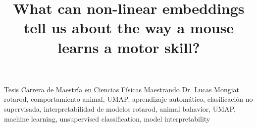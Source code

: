 \title{What can non-linear embeddings tell us about the way a mouse learns a motor skill?}
\trabajo
{
	Tesis
}
\carrera
{
	Carrera de Maestría en Ciencias Físicas
}
\grado
{
    Maestrando
}
\jurado
{
	Dr. Lucas Mongiat
}
\palabrasclave
{
	rotarod,
	comportamiento animal,
	UMAP,
	aprendizaje automático,
	clasificación no supervisada,
	interpretabilidad de modelos
}
\keywords
{
	rotarod,
	animal bahavior,
	UMAP,
	machine learning,
	unsupervised classification,
	model interpretability
}
